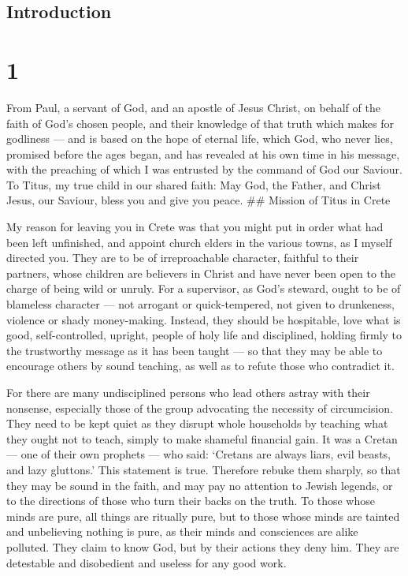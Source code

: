 \hypertarget{introduction}{%
\subsection{Introduction}\label{introduction}}

\hypertarget{section}{%
\section{1}\label{section}}

 From Paul, a servant of God, and an apostle of Jesus
Christ, on behalf of the faith of God's chosen people, and their
knowledge of that truth which makes for godliness  --- and
is based on the hope of eternal life, which God, who never lies,
promised before the ages began,  and has revealed at his own
time in his message, with the preaching of which I was entrusted by the
command of God our Saviour.  To Titus, my true child in our
shared faith: May God, the Father, and Christ Jesus, our Saviour, bless
you and give you peace. \#\# Mission of Titus in Crete

 My reason for leaving you in Crete was that you might put
in order what had been left unfinished, and appoint church elders in the
various towns, as I myself directed you.  They are to be of
irreproachable character, faithful to their partners, whose children are
believers in Christ and have never been open to the charge of being wild
or unruly.  For a supervisor, as God's steward, ought to be
of blameless character --- not arrogant or quick-tempered, not given to
drunkeness, violence or shady money-making.  Instead, they
should be hospitable, love what is good, self-controlled, upright,
people of holy life and disciplined,  holding firmly to the
trustworthy message as it has been taught --- so that they may be able
to encourage others by sound teaching, as well as to refute those who
contradict it.

 For there are many undisciplined persons who lead others
astray with their nonsense, especially those of the group advocating the
necessity of circumcision.  They need to be kept quiet as
they disrupt whole households by teaching what they ought not to teach,
simply to make shameful financial gain.  It was a Cretan
--- one of their own prophets --- who said: `Cretans are always liars,
evil beasts, and lazy gluttons.' This statement is true. 
Therefore rebuke them sharply, so that they may be sound in the faith,
 and may pay no attention to Jewish legends, or to the
directions of those who turn their backs on the truth.  To
those whose minds are pure, all things are ritually pure, but to those
whose minds are tainted and unbelieving nothing is pure, as their minds
and consciences are alike polluted.  They claim to know
God, but by their actions they deny him. They are detestable and
disobedient and useless for any good work.

